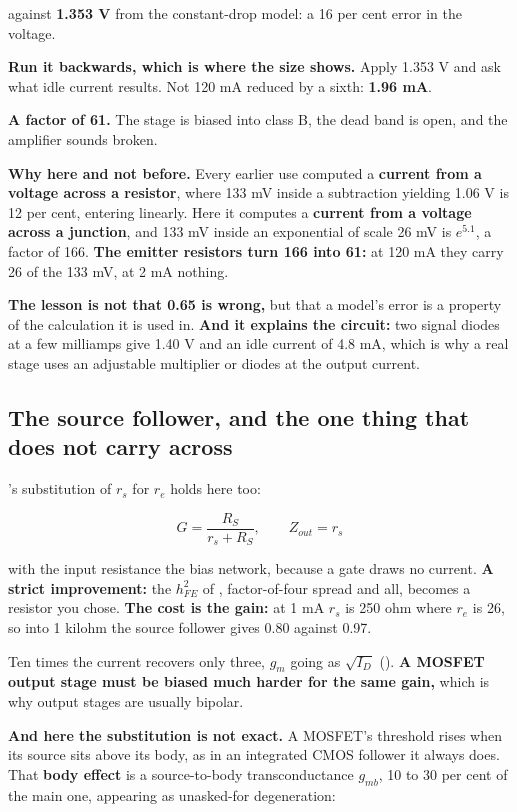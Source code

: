 against \textbf{1.353 V} from the constant-drop model: a 16 per cent error in the voltage.

\textbf{Run it backwards, which is where the size shows.} Apply 1.353 V and ask what idle current results. Not 120 mA reduced by a sixth: \textbf{1.96 mA}.

\textbf{A factor of 61.} The stage is biased into class B, the dead band is open, and the amplifier sounds broken.

\textbf{Why here and not before.} Every earlier use computed a \textbf{current from a voltage across a resistor}, where 133 mV inside a subtraction yielding 1.06 V is 12 per cent, entering linearly. Here it computes a \textbf{current from a voltage across a junction}, and 133 mV inside an exponential of scale 26 mV is $e^{5.1}$, a factor of 166. \textbf{The emitter resistors turn 166 into 61:} at 120 mA they carry 26 of the 133 mV, at 2 mA nothing.

\textbf{The lesson is not that 0.65 is wrong,} but that a model's error is a property of the calculation it is used in. \textbf{And it explains the circuit:} two signal diodes at a few milliamps give 1.40 V and an idle current of 4.8 mA, which is why a real stage uses an adjustable multiplier or diodes at the output current.

\subsection{The source follower, and the one thing that does not carry across}
\label{c8:sec:b6}
's substitution of $r_s$ for $r_e$ holds here too:

\[
  G = \frac{R_S}{r_s + R_S}, \qquad Z_{out} = r_s
\]

with the input resistance the bias network, because a gate draws no current. \textbf{A strict improvement:} the $h_{FE}^2$ of , factor-of-four spread and all, becomes a resistor you chose. \textbf{The cost is the gain:} at 1 mA $r_s$ is 250 ohm where $r_e$ is 26, so into 1 kilohm the source follower gives 0.80 against 0.97.

Ten times the current recovers only three, $g_m$ going as $\sqrt{I_D}$ (). \textbf{A MOSFET output stage must be biased much harder for the same gain,} which is why output stages are usually bipolar.

\textbf{And here the substitution is not exact.} A MOSFET's threshold rises when its source sits above its body, as in an integrated CMOS follower it always does. That \textbf{body effect} is a source-to-body transconductance $g_{mb}$, 10 to 30 per cent of the main one, appearing as unasked-for degeneration:

